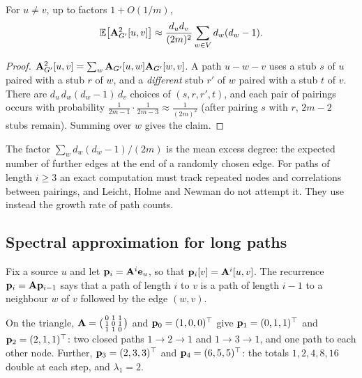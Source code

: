 \begin{notechapter}
\begin{proposition}\label{node-similarity:prop:expected-path2}
For $u \ne v$, up to factors $1 + O(1/m)$,
\begin{equation}
\mathbb{E}\bigl[\mathbf{A}_{G'}^2[u,v]\bigr] \approx \frac{d_u d_v}{(2m)^2} \sum_{w \in V} d_w(d_w - 1).
\label{node-similarity:eq:expected-path2}
\end{equation}
\end{proposition}

\begin{proof}
$\mathbf{A}_{G'}^2[u,v] = \sum_w \mathbf{A}_{G'}[u,w]\mathbf{A}_{G'}[w,v]$. A path $u - w - v$ uses a stub $s$ of $u$ paired with a stub $r$ of $w$, and a \emph{different} stub $r'$ of $w$ paired with a stub $t$ of $v$. There are $d_u\,d_w(d_w - 1)\,d_v$ choices of $(s, r, r', t)$, and each pair of pairings occurs with probability $\frac{1}{2m-1}\cdot\frac{1}{2m-3} \approx \frac{1}{(2m)^2}$ (after pairing $s$ with $r$, $2m - 2$ stubs remain). Summing over $w$ gives the claim.
\end{proof}

The factor $\sum_w d_w(d_w - 1)/(2m)$ is the mean excess degree: the expected number of further edges at the end of a randomly chosen edge. For paths of length $i\ge3$ an exact computation must track repeated nodes and correlations between pairings, and Leicht, Holme and Newman do not attempt it. They use instead the growth rate of path counts.

\subsection{Spectral approximation for long paths}

Fix a source $u$ and let $\mathbf{p}_i = \mathbf{A}^i\mathbf{e}_u$, so that $\mathbf{p}_i[v] = \mathbf{A}^i[u,v]$. The recurrence $\mathbf{p}_i = \mathbf{A}\mathbf{p}_{i-1}$ says that a path of length $i$ to $v$ is a path of length $i-1$ to a neighbour $w$ of $v$ followed by the edge $(w, v)$.

\begin{example}
On the triangle, $\mathbf{A} = \bigl(\begin{smallmatrix}0&1&1\\1&0&1\\1&1&0\end{smallmatrix}\bigr)$ and $\mathbf{p}_0 = (1, 0, 0)^\top$ give $\mathbf{p}_1 = (0, 1, 1)^\top$ and $\mathbf{p}_2 = (2, 1, 1)^\top$: two closed paths $1 \to 2 \to 1$ and $1 \to 3 \to 1$, and one path to each other node. Further, $\mathbf{p}_3 = (2, 3, 3)^\top$ and $\mathbf{p}_4 = (6, 5, 5)^\top$: the totals $1, 2, 4, 8, 16$ double at each step, and $\lambda_1 = 2$.
\end{example}


\end{notechapter}
